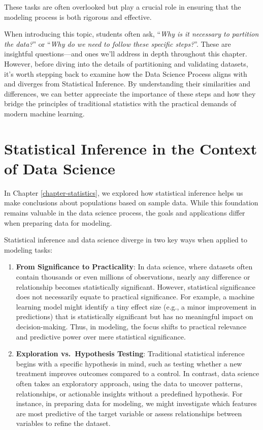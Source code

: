 \documentclass[
]{book}
\theoremstyle{definition}
\theoremstyle{definition}
\theoremstyle{definition}
\theoremstyle{definition}
\theoremstyle{remark}
\begin{document}
These tasks are often overlooked but play a crucial role in ensuring that the modeling process is both rigorous and effective.

When introducing this topic, students often ask, ``\emph{Why is it necessary to partition the data?}'' or ``\emph{Why do we need to follow these specific steps?}''. These are insightful questions---and ones we'll address in depth throughout this chapter. However, before diving into the details of partitioning and validating datasets, it's worth stepping back to examine how the Data Science Process aligns with and diverges from Statistical Inference. By understanding their similarities and differences, we can better appreciate the importance of these steps and how they bridge the principles of traditional statistics with the practical demands of modern machine learning.

\section{Statistical Inference in the Context of Data Science}\label{statistical-inference-in-the-context-of-data-science}

In Chapter \ref{chapter-statistics}, we explored how statistical inference helps us make conclusions about populations based on sample data. While this foundation remains valuable in the data science process, the goals and applications differ when preparing data for modeling.

Statistical inference and data science diverge in two key ways when applied to modeling tasks:

\begin{enumerate}
\def\labelenumi{\arabic{enumi}.}
\item
  \textbf{From Significance to Practicality}: In data science, where datasets often contain thousands or even millions of observations, nearly any difference or relationship becomes statistically significant. However, statistical significance does not necessarily equate to practical significance. For example, a machine learning model might identify a tiny effect size (e.g., a minor improvement in predictions) that is statistically significant but has no meaningful impact on decision-making. Thus, in modeling, the focus shifts to practical relevance and predictive power over mere statistical significance.
\item
  \textbf{Exploration vs.~Hypothesis Testing}: Traditional statistical inference begins with a specific hypothesis in mind, such as testing whether a new treatment improves outcomes compared to a control. In contrast, data science often takes an exploratory approach, using the data to uncover patterns, relationships, or actionable insights without a predefined hypothesis. For instance, in preparing data for modeling, we might investigate which features are most predictive of the target variable or assess relationships between variables to refine the dataset.
\end{enumerate}
\end{document}
